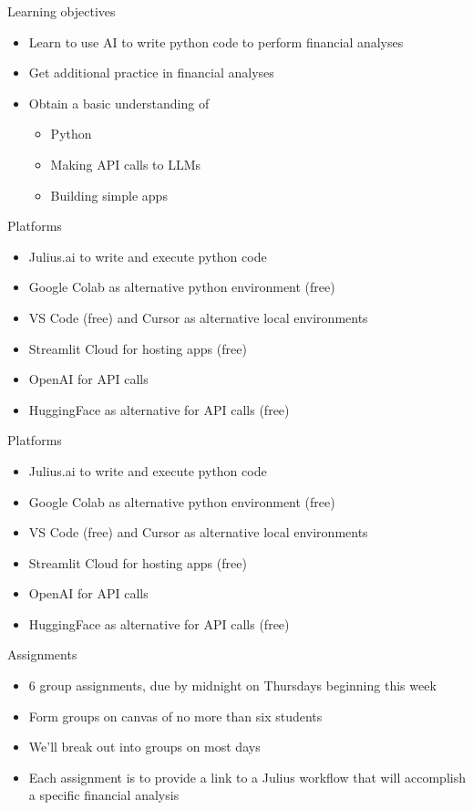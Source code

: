 \documentclass[10pt]{beamer}
\begin{document}
\begin{frame}{Learning objectives}
\begin{itemize}
\item Learn to use AI to write python code to perform financial analyses
\item Get additional practice in financial analyses
\item Obtain a basic understanding of
  \begin{itemize}
  \item Python
  \item Making API calls to LLMs
  \item Building simple apps
  \end{itemize}
\end{itemize}
\end{frame}


\begin{frame}{Platforms}
\begin{itemize}
\item Julius.ai to write and execute python code
\item Google Colab as alternative python environment (free)
\item VS Code (free) and Cursor as alternative local environments
\item Streamlit Cloud for hosting apps (free)
\item OpenAI for API calls
\item HuggingFace as alternative for API calls (free)
\end{itemize}
\end{frame}

\begin{frame}{Platforms}
\begin{itemize}
\item \alert{Julius.ai to write and execute python code}
\item Google Colab as alternative python environment (free)
\item VS Code (free) and Cursor as alternative local environments
\item Streamlit Cloud for hosting apps (free)
\item OpenAI for API calls
\item HuggingFace as alternative for API calls (free)
\end{itemize}
\end{frame}
\begin{frame}{Assignments}
\begin{itemize}
\item 6 group assignments, due by midnight on Thursdays beginning this week
\item Form groups on canvas of no more than six students
\item We'll break out into groups on most days
\item Each assignment is to provide a link to a Julius workflow that will accomplish a specific financial analysis

\end{itemize}
\end{frame}
\end{document}
